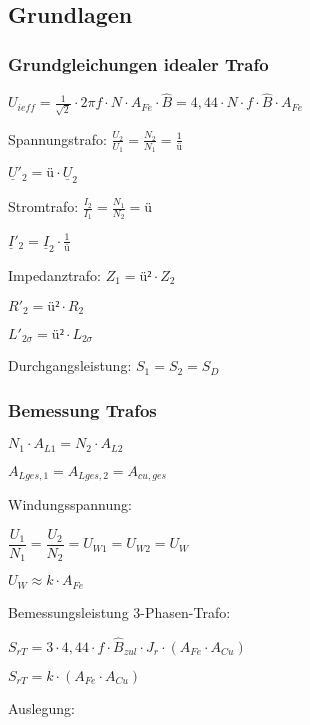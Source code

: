 \documentclass[a4paper,11pt]{article}
\begin{document}
	\subsection{Grundlagen}
	\subsubsection{Grundgleichungen idealer Trafo}
	
	$U_{ieff} = \frac{1}{\sqrt{2}} \cdot 2 \pi f \cdot N \cdot A_{Fe} \cdot \hat{B} = 4,44 \cdot N \cdot f \cdot \hat{B} \cdot A_{Fe}$
	
	Spannungstrafo:
	$\frac{U_{2}}{U_{1}} = \frac{N_{2}}{N_{1}} = \frac{1}{\text{ü}}$ 

	$\underline{U}'_{2} = \text{ü} \cdot \underline{U}_{2} $

	Stromtrafo:
	$\frac{I_{2}}{I_{1}} = \frac{N_{1}}{N_{2}} = \text{ü}$

	$\underline{I}'_{2} = \underline{I}_{2} \cdot \frac{1}{\text{ü}}$ 
	
	Impedanztrafo:
	$Z_{1} = \text{ü²} \cdot Z_{2}$

	$R'_{2} = \text{ü²} \cdot R_{2}$

	$L'_{2\sigma} = \text{ü²} \cdot L_{2\sigma}$



	Durchgangsleistung:	
	$S_{1} = S_{2} = S_{D}$

	\subsubsection{Bemessung Trafos}
	
	$N_{1} \cdot A_{L1} = N_{2} \cdot A_{L2}$

	$A_{Lges,1} = A_{Lges,2} = A_{cu,ges} $
	
	Windungsspannung:

	$\dfrac{U_{1}}{N_{1}} = \dfrac{U_{2}}{N_{2}} = U_{W1} = U_{W2} = U_{W}$

	$U_{W} \approx k \cdot A_{Fe}$
	
	Bemessungsleistung 3-Phasen-Trafo:

	$S_{rT} = 3 \cdot 4,44 \cdot f \cdot \hat{B}_{zul} \cdot J_{r} \cdot (A_{Fe} \cdot A_{Cu})$

	$S_{rT} = k \cdot (A_{Fe} \cdot A_{Cu})$

	Auslegung: 
	
\end{document}

